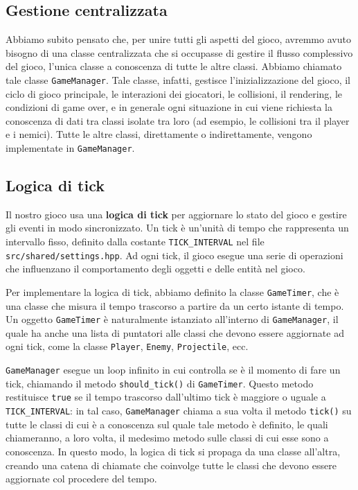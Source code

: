 \documentclass[a4paper,12pt]{article}
\begin{document}
\subsection{Gestione centralizzata}
Abbiamo subito pensato che, per unire tutti gli aspetti del gioco, avremmo avuto bisogno di una classe centralizzata che si occupasse di gestire il flusso complessivo del gioco, l’unica classe a conoscenza di tutte le altre classi. Abbiamo chiamato tale classe \texttt{GameManager}. Tale classe, infatti, gestisce l'inizializzazione del gioco, il ciclo di gioco principale, le interazioni dei giocatori, le collisioni, il rendering, le condizioni di game over, e in generale ogni situazione in cui viene richiesta la conoscenza di dati tra classi isolate tra loro (ad esempio, le collisioni tra il player e i nemici). Tutte le altre classi, direttamente o indirettamente, vengono implementate in \texttt{GameManager}.

\subsection{Logica di tick}
Il nostro gioco usa una \textbf{logica di tick} per aggiornare lo stato del gioco e gestire gli eventi in modo sincronizzato. Un tick è un'unità di tempo che rappresenta un intervallo fisso, definito dalla costante \texttt{TICK\_INTERVAL} nel file \texttt{src/shared/settings.hpp}. Ad ogni tick, il gioco esegue una serie di operazioni che influenzano il comportamento degli oggetti e delle entità nel gioco.

Per implementare la logica di tick, abbiamo definito la classe \texttt{GameTimer}, che è una classe che misura il tempo trascorso a partire da un certo istante di tempo. Un oggetto \texttt{GameTimer} è naturalmente istanziato all'interno di \texttt{GameManager}, il quale ha anche una lista di puntatori alle classi che devono essere aggiornate ad ogni tick, come la classe \texttt{Player}, \texttt{Enemy}, \texttt{Projectile}, ecc.

\texttt{GameManager} esegue un loop infinito in cui controlla se è il momento di fare un tick, chiamando il metodo \texttt{should\_tick()} di \texttt{GameTimer}. Questo metodo restituisce \texttt{true} se il tempo trascorso dall'ultimo tick è maggiore o uguale a \texttt{TICK\_INTERVAL}: in tal caso, \texttt{GameManager} chiama a sua volta il metodo \texttt{tick()} su tutte le classi di cui è a conoscenza sul quale tale metodo è definito, le quali chiameranno, a loro volta, il medesimo metodo sulle classi di cui esse sono a conoscenza. In questo modo, la logica di tick si propaga da una classe all'altra, creando una catena di chiamate che coinvolge tutte le classi che devono essere aggiornate col procedere del tempo.
\end{document}

